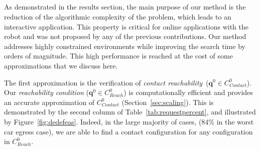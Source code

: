 \documentclass[journal]{IEEEtran}
\newcommand{\contactreachability}{\textit{contact reachability}}	%
\newcommand{\gls}[1]{\textit{#1}}
\providecommand{\DIFdeltex}[1]{} %
\providecommand{\DIFdelbegin}{\protect\cbdelete} %
\providecommand{\DIFdelend}{} %
\providecommand{\DIFdel}[1]{\texorpdfstring{\DIFdeltex{#1}}{}} %
\begin{document}
\DIFdelbegin \subsection{\DIFdel{Accuracy and performance gain of the reachability condition}}
\addtocounter{subsection}{-1}%
\DIFdelend %

As demonstrated in the results section, the main purpose of our method is the reduction of the algorithmic complexity of the problem, which leads to an interactive 
application. This property is critical for 
online applications with the robot and was not proposed by any of the previous contributions. Our method addresses highly constrained environments while improving the search time by orders of magnitude. This high performance is reached at the cost of some approximations that we discuss here. 

The first approximation is the verification of \contactreachability\ ($\mathbf{q}^0 \in C_{Contact}^0$).  Our \textit{reachability condition} ($\mathbf{q}^0 \in C_{Reach}^0$) is computationally efficient and provides an accurate approximation of $C_{Contact}^0$ (Section~\ref{sec:scaling}). This is demonstrated by the second column of Table~\ref{tab:requestpercent}, and illustrated by Figure~\ref{fig:dedefeas}. Indeed, in the large majority of cases, (84\% in the worst car egress case), we are able to find a contact configuration for any configuration in $C_{Reach}^0$.

\end{document}
